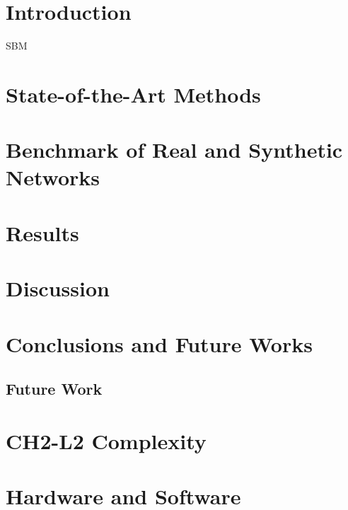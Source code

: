 \documentclass[a4paper,11 pt, openright, titlepage]{report}
\newcommand{\blankpage}{\newpage\shipout\null}
\begin{document}
\blankpage
\blankpage

\chapter{Introduction}
\gls{SBM} \cite{Muscoloni2017}
\chapter{State-of-the-Art Methods} \label{ch:SoAmethods}


\chapter{Benchmark of Real and Synthetic Networks}


\chapter{Results}


\chapter{Discussion} \label{ch:discussion}

\chapter{Conclusions and Future Works}

\section{Future Work}

\begin{appendices}
\chapter{CH2-L2 Complexity} \label{appendix:complexity}


\chapter{Hardware and Software} \label{appendix:hardware}

\end{appendices}
\newpage



\end{document}

